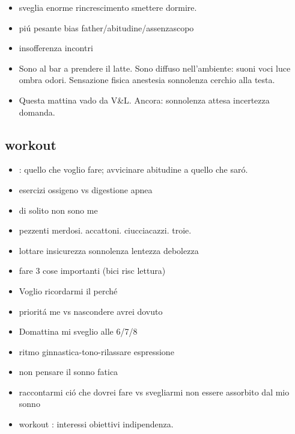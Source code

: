 \begin{itemize}
\item sveglia enorme rincrescimento smettere dormire.

\item pi\'u pesante bias father/abitudine/assenzascopo

\item insofferenza incontri

\item Sono al bar a prendere il latte. Sono diffuso nell'ambiente: suoni voci luce ombra odori. Sensazione fisica anestesia sonnolenza cerchio alla testa.

\item Questa mattina vado da V\&L. Ancora: sonnolenza attesa incertezza domanda.

\end{itemize}


\subsection{workout}

\begin{itemize}

\item {}: quello che voglio fare; avvicinare abitudine a quello che sar\'o.

\item esercizi ossigeno vs digestione apnea

\item di solito non sono me

\item pezzenti merdosi. accattoni. ciucciacazzi. troie.

\item lottare insicurezza sonnolenza lentezza debolezza

\item fare 3 cose importanti (bici risc lettura)

\item Voglio ricordarmi il perch\'e

\item priorit\'a me vs nascondere avrei dovuto

\item Domattina mi sveglio alle 6/7/8

\item ritmo ginnastica-tono-rilassare espressione

\item non pensare il sonno fatica

\item raccontarmi ci\'o che dovrei fare vs svegliarmi non essere assorbito dal mio sonno

\item workout : interessi obiettivi indipendenza.

\end{itemize}

